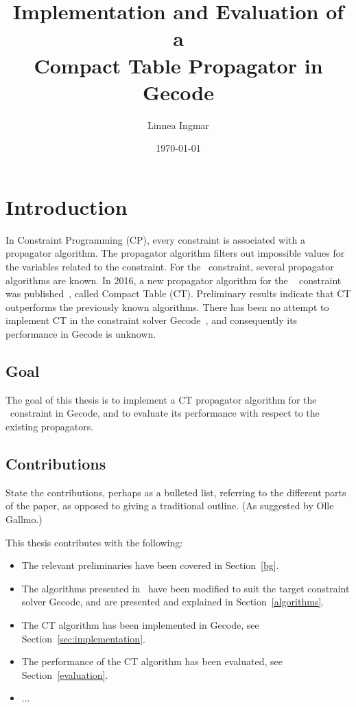 \documentclass[a4paper,11pt]{article}
\title{\textbf{Implementation and Evaluation of a\\
    Compact Table Propagator in Gecode
  }
}
\author{Linnea Ingmar} %
\date{\today}
\newcommand{\Todo}[1]{{\color{blue}#1}}
\newcommand{\Chapref}[1]{Section~\ref{#1}}
\newcommand{\Table}{\Constraint{Table}~}
\newcommand{\CTpaper}[0]{DBLP:conf/cp/DemeulenaereHLP16}
\numberwithin{equation}{section}
\begin{document}
\maketitle

\tableofcontents

\newpage

\section{Introduction}
\label{intro}

In Constraint Programming (CP), every constraint is associated with a propagator
algorithm. The propagator algorithm filters out impossible values for the variables
related to the constraint. For the \Table constraint, several propagator
algorithms are known. In 2016, a new propagator algorithm for the \Table
constraint was published~\cite{\CTpaper}, called Compact Table (CT).
Preliminary results indicate that CT outperforms the previously known algorithms.
There has been no attempt to implement CT in the constraint solver Gecode~\cite{Gecode}, and consequently its performance in Gecode is unknown.

\subsection{Goal}
\label{intro:goal}
The goal of this thesis is to implement a CT propagator
algorithm for the \Table constraint in Gecode,
and to evaluate its performance with respect to the existing propagators.

\subsection{Contributions}
\label{intro:contributions}

\Todo{State the contributions, perhaps as a bulleted list, referring to the different
parts of the paper, as opposed to giving a traditional outline. (As suggested
by Olle Gallmo.)}

This thesis contributes with the following:

\begin{itemize}
  \item The relevant preliminaries have been covered in \Chapref{bg}.
  \item The algorithms presented in~\cite{DBLP:conf/cp/DemeulenaereHLP16} have been modified to suit the
    target constraint solver Gecode, and are presented and explained in 
    \Chapref{algorithms}.
  \item The CT algorithm has been implemented in Gecode, see \Chapref{sec:implementation}.
  \item The performance of the CT algorithm has been evaluated, see \Chapref{evaluation}.
  \item ...
\end{itemize}
\end{document}
